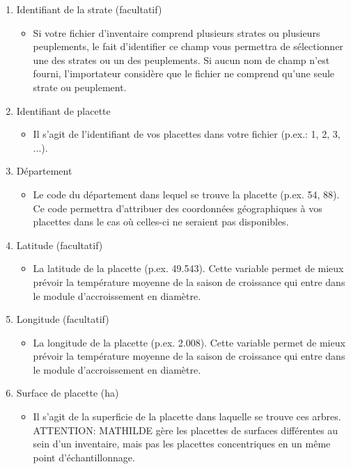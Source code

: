 \documentclass[a4paper,12pt]{article}
\begin{document}
\begin{enumerate}
  	\item Identifiant de la strate (facultatif)
    \begin{itemize}
     	\item Si votre fichier d'inventaire comprend plusieurs strates ou plusieurs peuplements, le fait d'identifier ce champ vous permettra de sélectionner une des strates ou un des peuplements. Si aucun nom de champ n'est fourni, l'importateur considère que le fichier ne comprend qu'une seule strate ou peuplement.
    \end{itemize} 
  	\item Identifiant de placette
    \begin{itemize}
		\item Il s'agit de l'identifiant de vos placettes dans votre fichier (p.ex.: 1, 2, 3, ...).
    \end{itemize} 
    \item Département
    \begin{itemize}
    		\item Le code du département dans lequel se trouve la placette (p.ex. 54, 88). Ce code permettra d'attribuer des coordonnées géographiques à vos placettes dans le cas où celles-ci ne seraient pas disponibles. 
    \end{itemize}
    \item Latitude (facultatif)
    \begin{itemize}
    		\item La latitude de la placette (p.ex. 49.543). Cette variable permet de mieux prévoir la température moyenne de la saison de croissance qui entre dans le module d'accroissement en diamètre.
    \end{itemize}
    \item Longitude (facultatif)
    \begin{itemize}
    		\item La longitude de la placette (p.ex. 2.008). Cette variable permet de mieux prévoir la température moyenne de la saison de croissance qui entre dans le module d'accroissement en diamètre.
    \end{itemize}
  	\item Surface de placette (ha)
    \begin{itemize}
	     \item Il s'agit de la superficie de la placette dans laquelle se trouve ces arbres. ATTENTION: MATHILDE gère les placettes de surfaces différentes au sein d'un inventaire, mais pas les placettes concentriques en un même point d'échantillonnage.

\end{itemize}
\end{enumerate}
\end{document}
